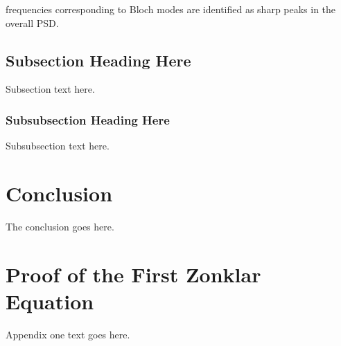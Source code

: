 \documentclass[journal,transmag]{IEEEtran}
\begin{document}
frequencies corresponding to Bloch modes are identified as sharp peaks in the overall PSD.\@




\subsection{Subsection Heading Here}
Subsection text here.

\subsubsection{Subsubsection Heading Here}
Subsubsection text here.


\section{Conclusion}
The conclusion goes here.






%


\appendices{}
\section{Proof of the First Zonklar Equation}
Appendix one text goes here.
\end{document}
